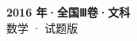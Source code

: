 \documentclass[zihao=-4, a4paper]{ctexart}
\begin{document}
\begin{center}
  {\Large\bfseries 2016 年·全国Ⅲ卷·文科}\\[4pt]
  {\large 数学 · 试题版}
\end{center}
\medskip
{}

\end{document}
